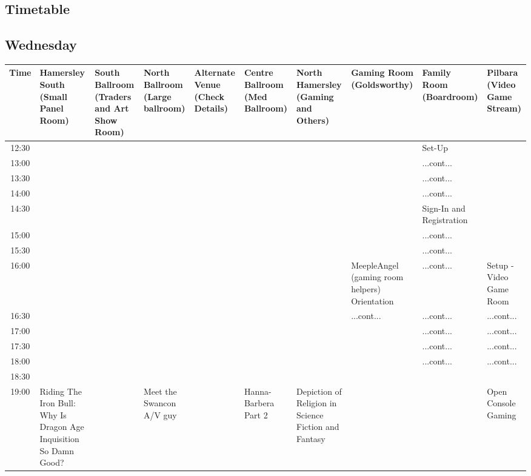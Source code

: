 \documentclass{scrreprt}
\begin{document}
\begin{landscape}
\section*{Timetable}\subsection*{Wednesday}\tiny
\begin{tabular}{c||p{25mm}|p{25mm}|p{25mm}|p{25mm}|p{25mm}|p{25mm}|p{25mm}|p{25mm}|p{25mm}|}
Time&Hamersley South (Small Panel Room)&South Ballroom (Traders and Art Show Room)&North Ballroom (Large ballroom)&Alternate Venue (Check Details)&Centre Ballroom (Med Ballroom)&North Hamersley (Gaming and Others)&Gaming Room (Goldsworthy)&Family Room (Boardroom)&Pilbara (Video Game Stream)\\
\hline
\hline
12:30&&&&&&&&\cellcolor[gray]{0.944920} Set-Up&\\
13:00&&&&&&&&\cellcolor[gray]{0.944920} ...cont...&\\
13:30&&&&&&&&\cellcolor[gray]{0.944920} ...cont...&\\
14:00&&&&&&&&\cellcolor[gray]{0.944920} ...cont...&\\
14:30&&&&&&&&\cellcolor[gray]{0.588592} Sign-In and Registration&\\
15:00&&&&&&&&\cellcolor[gray]{0.588592} ...cont...&\\
15:30&&&&&&&&\cellcolor[gray]{0.588592} ...cont...&\\
16:00&&&&&&&\cellcolor[gray]{0.906330} MeepleAngel (gaming room helpers) Orientation&\cellcolor[gray]{0.588592} ...cont...&\cellcolor[gray]{0.671687} Setup - Video Game Room\\
16:30&&&&&&&\cellcolor[gray]{0.906330} ...cont...&\cellcolor[gray]{0.588592} ...cont...&\cellcolor[gray]{0.671687} ...cont...\\
17:00&&&&&&&&\cellcolor[gray]{0.588592} ...cont...&\cellcolor[gray]{0.671687} ...cont...\\
17:30&&&&&&&&\cellcolor[gray]{0.588592} ...cont...&\cellcolor[gray]{0.671687} ...cont...\\
18:00&&&&&&&&\cellcolor[gray]{0.588592} ...cont...&\cellcolor[gray]{0.671687} ...cont...\\
18:30&&&&&&&&&\\
19:00&\cellcolor[gray]{0.761280} Riding The Iron Bull: Why Is Dragon Age Inquisition So Damn Good?&&\cellcolor[gray]{0.795877} Meet the Swancon A/V guy&&\cellcolor[gray]{0.601129} Hanna-Barbera Part 2&\cellcolor[gray]{0.613893} Depiction of Religion in Science Fiction and Fantasy&&&\cellcolor[gray]{0.894562} Open Console Gaming\\

\end{tabular}
\end{landscape}
\end{document}

